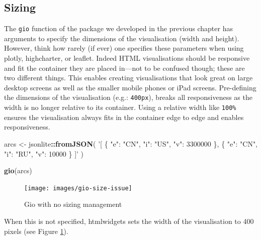 \documentclass[10pt,]{krantz}
\makeatletter
\newenvironment{Shaded}{\begin{snugshade}}{\end{snugshade}}
\newcommand{\CommentTok}[1]{\textcolor[rgb]{0.37,0.37,0.37}{\textit{#1}}}
\newcommand{\DataTypeTok}[1]{\textcolor[rgb]{0.27,0.27,0.27}{#1}}
\newcommand{\DecValTok}[1]{\textcolor[rgb]{0.06,0.06,0.06}{#1}}
\newcommand{\KeywordTok}[1]{\textcolor[rgb]{0.27,0.27,0.27}{\textbf{#1}}}
\newcommand{\NormalTok}[1]{#1}
\newcommand{\OperatorTok}[1]{\textcolor[rgb]{0.43,0.43,0.43}{\textbf{#1}}}
\newcommand{\StringTok}[1]{\textcolor[rgb]{0.5,0.5,0.5}{#1}}
\newenvironment{kframe}{%
\medskip{}
\setlength{\fboxsep}{.8em}
 \def\at@end@of@kframe{}%
 \ifinner\ifhmode%
  \def\at@end@of@kframe{\end{minipage}}%
  \begin{minipage}{\columnwidth}%
 \fi\fi%
 \def\FrameCommand##1{\hskip\@totalleftmargin \hskip-\fboxsep
 \colorbox{shadecolor}{##1}\hskip-\fboxsep
     \hskip-\linewidth \hskip-\@totalleftmargin \hskip\columnwidth}%
 \MakeFramed {\advance\hsize-\width
   \@totalleftmargin\z@ \linewidth\hsize
   \@setminipage}}%
 {\par\unskip\endMakeFramed%
 \at@end@of@kframe}
\renewenvironment{Shaded}{\begin{kframe}}{\end{kframe}}
\makeatother
\begin{document}
\hypertarget{widgets-adv-sizing}{%
\subsection{Sizing}\label{widgets-adv-sizing}}

The \texttt{gio} function of the package we developed in the previous chapter has arguments to specify the dimensions of the visualisation (width and height). However, think how rarely (if ever) one specifies these parameters when using plotly, highcharter, or leaflet. Indeed HTML visualisations should be responsive and fit the container they are placed in---not to be confused though; these are two different things. This enables creating visualisations that look great on large desktop screens as well as the smaller mobile phones or iPad screens. Pre-defining the dimensions of the visualisation (e.g.: \texttt{400px}), breaks all responsiveness as the width is no longer relative to its container. Using a relative width like \texttt{100\%} ensures the visualisation always fits in the container edge to edge and enables responsiveness.

\begin{Shaded}
\begin{Highlighting}[]
\NormalTok{arcs <-}\StringTok{ }\NormalTok{jsonlite}\OperatorTok{::}\KeywordTok{fromJSON}\NormalTok{(}
  \StringTok{'[}
\StringTok{    \{}
\StringTok{      "e": "CN",}
\StringTok{      "i": "US",}
\StringTok{      "v": 3300000}
\StringTok{    \},}
\StringTok{    \{}
\StringTok{      "e": "CN",}
\StringTok{      "i": "RU",}
\StringTok{      "v": 10000}
\StringTok{    \}}
\StringTok{  ]'}
\NormalTok{)}

\KeywordTok{gio}\NormalTok{(arcs)}
\end{Highlighting}
\end{Shaded}

\begin{figure}[H]

{\centering \texttt{[image: images/gio-size-issue]} 

}

\caption{Gio with no sizing management}\label{fig:gio-size-issue}
\end{figure}

When this is not specified, htmlwidgets sets the width of the visualisation to 400 pixels (see Figure \ref{fig:gio-size-issue}).

\begin{Shaded}
\end{Shaded}
\end{document}
